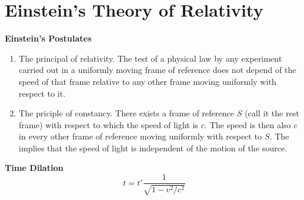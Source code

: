 \section{Einstein's Theory of Relativity}
\textbf{Einstein's Postulates}
\begin{enumerate}
	\item The principal of relativity. The test of a physical law by any experiment carried out in a uniformly moving frame of reference does not depend of the speed of that frame relative to any other frame moving uniformly with respect to it. 
	\item The priciple of constancy. There exists a frame of reference $ S $ (call it the rest frame) with respect to which the speed of light is $ c $. The speed is then also $ c $ in every other frame of reference moving uniformly with respect to $ S $. The implies that the speed of light is independent of the motion of the source. 
\end{enumerate}
\textbf{Time Dilation}
\[ t = t' \dfrac{1}{\sqrt{1 - v^2 / c^2}}  \]
